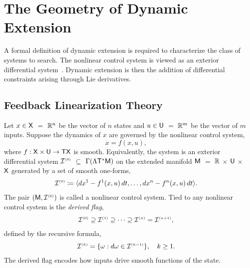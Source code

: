 \documentclass[a4paper]{ifacconf}
\begin{document}
\section{The Geometry of Dynamic Extension}
\label{section:geoemetry}
A formal definition of dynamic extension is required to characterize the class of systems to search.
The nonlinear control system is viewed as an exterior differential system~\citep{guay_condition_1997, dsouza_algorithm_2023}.
Dynamic extension is then the addition of differential constraints arising through Lie derivatives.

\subsection{Feedback Linearization Theory}
Let \(x \in \mathsf{X}\) \(=\) \(\mathbb{R}^n\) be the vector of \(n\) states and \(u \in \mathsf{U}\) \(=\) \(\mathbb{R}^m\) be the vector of \(m\) inputs.
Suppose the dynamics of \(x\) are governed by the nonlinear control system,
\begin{equation}
  \label{eqn:dynamics}
  \dot{x} = f(x, u),
\end{equation}
where \(f: \mathsf{X}\times\mathsf{U} \to \mathsf{T}\mathsf{X}\) is smooth.
Equivalently, the system is an exterior differential system \(\mathcal{I}^{\smash{\scriptscriptstyle(0)}}\) \(\subseteq\) \(\Gamma(\Lambda\mathsf{T}^*\mathsf{\mathsf{M}})\) on the extended manifold \(\mathsf{M}\) \(=\) \(\mathbb{R}\) \(\times\) \(\mathsf{U}\) \(\times\) \(\mathsf{X}\) generated by a set of smooth one-forms,
%
\begin{equation}
  \label{eqn:eds}
  \mathcal{I}^{\smash{\scriptscriptstyle(0)}}
    \coloneq 
      \langle
        dx^1 - f^1(x, u)\,dt,
        \ldots,
        dx^n - f^n(x, u)\,dt
      \rangle.
\end{equation}
%
The pair \((\mathsf{M}, \mathcal{I}^{\smash{\scriptscriptstyle(0)}})\) is called a nonlinear control system.
Tied to any nonlinear control system is the \emph{derived flag},
%
\[
  \mathcal{I}^{\smash{\scriptscriptstyle(0)}} \supseteq \mathcal{I}^{\smash{\scriptscriptstyle(1)}} \supseteq \cdots \supseteq \mathcal{I}^{\smash{\scriptscriptstyle(n)}} = \mathcal{I}^{\smash{\scriptscriptstyle(n+1)}},
\]
%
defined by the recursive formula,
%
\[
  \mathcal{I}^{\smash{\scriptscriptstyle(k)}} = \{
    \omega :
    d\omega \in \mathcal{I}^{\smash{\scriptscriptstyle(k-1)}}
  \},
  \quad
  k \geq 1.
\]
The derived flag encodes how inputs drive smooth functions of the state.
\end{document}
